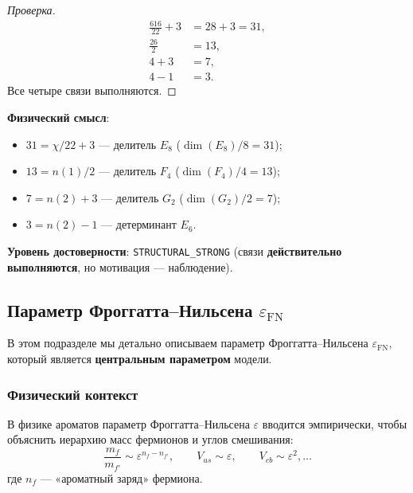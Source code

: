 \documentclass[11pt,a4paper]{article}
\newcommand{\epsFN}{\ensuremath{\varepsilon_{\text{FN}}}}
\theoremstyle{definition}
\begin{document}
\begin{proof}[Проверка]
\begin{align}
    \frac{616}{22} + 3 &= 28 + 3 = 31, \\
    \frac{26}{2} &= 13, \\
    4 + 3 &= 7, \\
    4 - 1 &= 3.
\end{align}
Все четыре связи выполняются.
\end{proof}

\medskip\noindent
\textbf{Физический смысл}:
\begin{itemize}
    \item $31 = \chi/22 + 3$ --- делитель $E_8$ ($\dim(E_8)/8 = 31$);
    \item $13 = n(1)/2$ --- делитель $F_4$ ($\dim(F_4)/4 = 13$);
    \item $7 = n(2) + 3$ --- делитель $G_2$ ($\dim(G_2)/2 = 7$);
    \item $3 = n(2) - 1$ --- детерминант $E_6$.
\end{itemize}

\medskip\noindent
\textbf{Уровень достоверности}: \texttt{STRUCTURAL\_STRONG}
(связи \textbf{действительно выполняются}, но мотивация --- наблюдение).

\subsection{Параметр Фроггатта--Нильсена \texorpdfstring{$\epsFN$}{epsilon\_FN}}
\label{subsec:eps-fn}

В этом подразделе мы детально описываем параметр Фроггатта--Нильсена
$\epsFN$, который является \textbf{центральным параметром} модели.

\subsubsection{Физический контекст}

В физике ароматов параметр Фроггатта--Нильсена $\varepsilon$ вводится
эмпирически, чтобы объяснить иерархию масс фермионов и углов
смешивания:
\begin{equation}
    \frac{m_f}{m_{f'}} \sim \varepsilon^{n_f - n_{f'}}, \qquad
    V_{us} \sim \varepsilon, \qquad V_{cb} \sim \varepsilon^2, \ldots
\end{equation}
где $n_f$ --- «ароматный заряд» фермиона.
\end{document}
